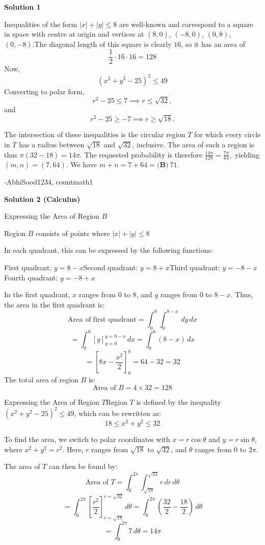 \begin{enumerate}
\textbf{Solution 1}

Inequalities of the form $|x|+|y| \le 8$ are well-known and correspond to a square in space with centre at origin and vertices at $(8, 0)$, $(-8, 0)$, $(0, 8)$, $(0, -8)$.The diagonal length of this square is clearly $16$, so it has an area of 
 \[\frac{1}{2} \cdot 16 \cdot 16 = 128\]Now,
 \[(x^2 + y^2 - 25)^2 \le 49\]Converting to polar form,
 \[r^2 - 25 \le 7 \implies r \le \sqrt{32},\]and
 \[r^2 - 25 \ge -7\implies r\ge \sqrt{18}.\]

 The intersection of these inequalities is the circular region $T$ for which every circle in $T$ has a radius between $\sqrt{18}$ and $\sqrt{32}$, inclusive. The area of such a region is thus $\pi(32-18)=14\pi.$ The requested probability is therefore $\frac{14\pi}{128} = \frac{7\pi}{64},$ yielding $(m,n)=(7,64).$ We have $m+n=7+64=\boxed{\textbf{(B)}\ 71}.$

 -AbhiSood1234, countmath1

 



\textbf{Solution 2 (Calculus)}

Expressing the Area of Region \( B \)

 Region \( B \) consists of points where \( |x| + |y| \le 8 \)

 In each quadrant, this can be expressed by the following functions:

 First quadrant: \( y = 8 - x \)Second quadrant: \( y = 8 + x \)Third quadrant: \( y = -8 - x \)Fourth quadrant: \( y = -8 + x \)

 In the first quadrant, \( x \) ranges from 0 to 8, and \( y \) ranges from 0 to \( 8 - x \). Thus, the area in the first quadrant is:
 \[\text{Area of first quadrant} = \int_0^8 \int_0^{8 - x} \, dy \, dx\]
 \[= \int_0^8 [y]_{y=0}^{y=8-x} \, dx = \int_0^8 (8 - x) \, dx\]
 \[= \left[ 8x - \frac{x^2}{2} \right]_0^8 = 64 - 32 = 32\]The total area of region \( B \) is:
 \[\text{Area of } B = 4 \times 32 = 128\]

 Expressing the Area of Region \( T \)Region \( T \) is defined by the inequality \( (x^2 + y^2 - 25)^2 \le 49 \), which can be rewritten as:
 \[18 \le x^2 + y^2 \le 32\]

 To find the area, we switch to polar coordinates with \( x = r \cos \theta \) and \( y = r \sin \theta \), where \( x^2 + y^2 = r^2 \). Here, \( r \) ranges from \( \sqrt{18} \) to \( \sqrt{32} \), and \( \theta \) ranges from 0 to \( 2\pi \).

 The area of \( T \) can then be found by:
 \[\text{Area of } T = \int_0^{2\pi} \int_{\sqrt{18}}^{\sqrt{32}} r \, dr \, d\theta\]
 \[= \int_0^{2\pi} \left[ \frac{r^2}{2} \right]_{r=\sqrt{18}}^{r=\sqrt{32}} \, d\theta = \int_0^{2\pi} \left( \frac{32}{2} - \frac{18}{2} \right) \, d\theta\]
 \[= \int_0^{2\pi} 7 \, d\theta = 14\pi\]


\end{enumerate}
